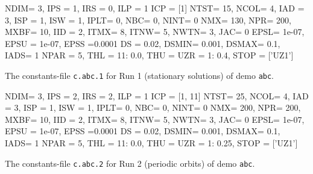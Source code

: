 \documentclass[12pt]{report}
\begin{document}
\begin{table}[htbp]
{\small
\begin{center}
\begin{boxedverbatim}
NDIM=   3, IPS =   1, IRS =   0, ILP =   1
ICP =  [1]
NTST=  15, NCOL=   4, IAD =   3, ISP =   1, ISW = 1, IPLT= 0, NBC= 0, NINT= 0
NMX=  130, NPR=  200, MXBF=  10, IID =   2, ITMX= 8, ITNW= 5, NWTN= 3, JAC= 0
EPSL= 1e-07, EPSU = 1e-07, EPSS =0.0001
DS  =  0.02, DSMIN= 0.001, DSMAX=   0.1, IADS=   1
NPAR = 5, THL =  {11: 0.0}, THU =  {}
UZR =  {1: 0.4}, STOP = ['UZ1']
\end{boxedverbatim}
\end{center}
}
\caption{The constants-file {\tt c.abc.1} for Run 1 (stationary solutions)
of demo {\tt abc}.}
\label{tbl:demo_abcC1}
\end{table}


\begin{table}[htbp]
{\small
\begin{center}
\begin{boxedverbatim}
NDIM=   3, IPS =   2, IRS =   2, ILP =   1
ICP =  [1, 11]
NTST=  25, NCOL=   4, IAD =   3, ISP =   1, ISW = 1, IPLT= 0, NBC= 0, NINT= 0
NMX=  200, NPR=  200, MXBF=  10, IID =   2, ITMX= 8, ITNW= 5, NWTN= 3, JAC= 0
EPSL= 1e-07, EPSU = 1e-07, EPSS =0.0001
DS  =  0.02, DSMIN= 0.001, DSMAX=   0.1, IADS=   1
NPAR = 5, THL =  {11: 0.0}, THU =  {}
UZR =  {1: 0.25}, STOP = ['UZ1']
\end{boxedverbatim}
\end{center}
}
\caption{The constants-file {\tt c.abc.2} for Run 2 (periodic orbits) 
of demo {\tt abc}.}
\label{tbl:demo_abcC2}
\end{table}
\end{document}
